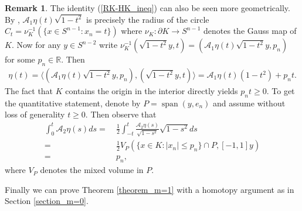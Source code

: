 \documentclass[12pt,twoside]{amsart}
\numberwithin{satz}{section}
\theoremstyle{definition}
\newtheorem{remark}[satz]{Remark}
\numberwithin{equation}{section}
\newcommand\R{\mathbb{R}}
\newcommand\spann{\operatorname{span}}
\begin{document}
	\begin{remark}\label{remark_CS_odd}
		The identity (\ref{RK-HK_ineq}) can also be seen more geometrically. By \cite[Theorem 3.3]{braunerhofstaetterortegamoreno2}, $\mathcal{A}_1\eta(t)\sqrt{1-t^2}$ is precisely the radius of the circle $C_t=\nu_K^{-1}(\{x\in S^{n-1}:x_n=t\})$ where $\nu_K:\partial K\to S^{n-1}$ denotes the Gauss map of $K$. Now for any $y\in S^{n-2}$ write $\nu_K^{-1}(\sqrt{1-t^2}y,t)=(\mathcal{A}_1\eta(t)\sqrt{1-t^2}y,p_n)$ for some $p_n\in\R$. Then
		\begin{align*}
			\eta(t)=\langle (\mathcal{A}_1\eta(t)\sqrt{1-t^2}y,p_n),(\sqrt{1-t^2}y,t)\rangle= \mathcal{A}_1\eta(t)(1-t^2)+p_nt.
		\end{align*}
		The fact that $K$ contains the origin in the interior directly yields $p_nt\geq0$. To get the quantitative statement, denote by $P=\spann(y,e_n)$ and assume without loss of generality $t\geq 0$. Then observe that
		\begin{align*}
			\int_0^t \mathcal{A}_2\eta(s)ds=& \ \frac{1}{2}\int_{-t}^t \frac{\mathcal{A}_2\eta(s)}{\sqrt{1-s^2}}\sqrt{1-s^2}ds \\
			=& \ \frac{1}{2}V_P(\{x\in K:|x_n|\leq p_n\}\cap P,[-1,1]y) \\
			=& \ p_n,
		\end{align*}
		where $V_P$ denotes the mixed volume in $P$.
	\end{remark}

	Finally we can prove Theorem \ref{theorem_m=1} with a homotopy argument as in Section \ref{section_m=0}.
	
\end{document}
